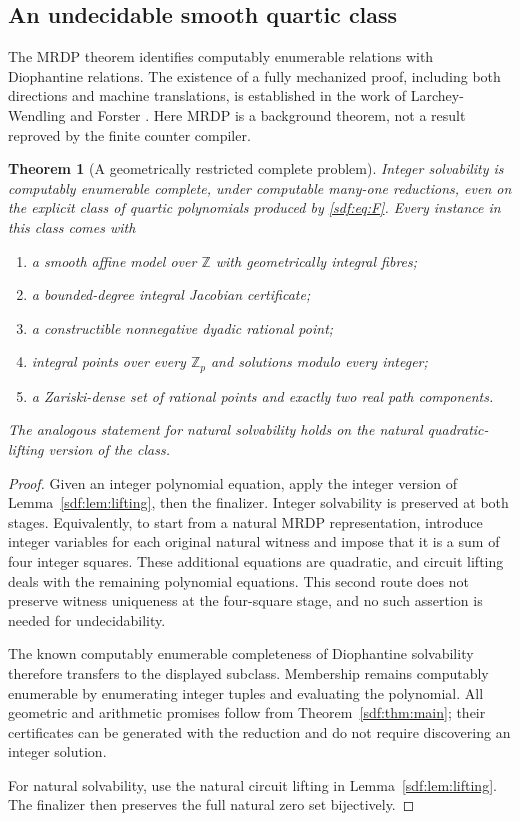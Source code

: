 \documentclass[11pt,a4paper]{article}
\newtheorem{theorem}{Theorem}[section]
\theoremstyle{definition}
\theoremstyle{remark}
\newcommand{\Z}{\mathbb Z}
\begin{document}
\subsection{An undecidable smooth quartic class}

The MRDP theorem identifies computably enumerable relations with
Diophantine relations. The existence of a fully mechanized proof, including
both directions and machine translations, is established in the work of
Larchey-Wendling and Forster \cite{coq}. Here MRDP is a background theorem,
not a result reproved by the finite counter compiler.

\begin{theorem}[A geometrically restricted complete problem]\label{sdf:thm:hardness}
Integer solvability is computably enumerable complete, under computable
many-one reductions, even on the explicit class of quartic polynomials
produced by \eqref{sdf:eq:F}. Every instance in this class comes with
\begin{enumerate}[label=\textnormal{(\alph*)}]
\item a smooth affine model over $\Z$ with geometrically integral fibres;
\item a bounded-degree integral Jacobian certificate;
\item a constructible nonnegative dyadic rational point;
\item integral points over every $\Z_p$ and solutions modulo every integer;
\item a Zariski-dense set of rational points and exactly two real path
components.
\end{enumerate}
The analogous statement for natural solvability holds on the natural
quadratic-lifting version of the class.
\end{theorem}
\begin{proof}
Given an integer polynomial equation, apply the integer version of
Lemma~\ref{sdf:lem:lifting}, then the finalizer. Integer solvability is
preserved at both stages. Equivalently, to start from a natural MRDP
representation, introduce integer variables for each original natural
witness and impose that it is a sum of four integer squares. These
additional equations are quadratic, and circuit lifting deals with the
remaining polynomial equations. This second route does not preserve
witness uniqueness at the four-square stage, and no such assertion is
needed for undecidability.

The known computably enumerable completeness of Diophantine solvability
therefore transfers to the displayed subclass. Membership remains
computably enumerable by enumerating integer tuples and evaluating the
polynomial. All geometric and arithmetic promises follow from
Theorem~\ref{sdf:thm:main}; their certificates can be generated with the
reduction and do not require discovering an integer solution.

For natural solvability, use the natural circuit lifting in
Lemma~\ref{sdf:lem:lifting}. The finalizer then preserves the full natural
zero set bijectively.
\end{proof}
\end{document}

